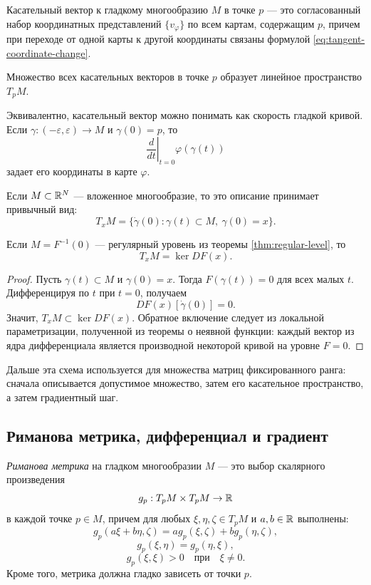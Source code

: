 \begin{definition}
Касательный вектор к гладкому многообразию $M$ в точке $p$ --- это согласованный набор координатных представлений $\{v_\varphi\}$ по всем картам, содержащим $p$, причем при переходе от одной карты к другой координаты связаны формулой \eqref{eq:tangent-coordinate-change}.
\end{definition}

Множество всех касательных векторов в точке $p$ образует линейное пространство $T_pM$.

Эквивалентно, касательный вектор можно понимать как скорость гладкой кривой. Если $\gamma:(-\varepsilon,\varepsilon)\to M$ и $\gamma(0)=p$, то
\[
\left.\frac{d}{dt}\right|_{t=0}\varphi(\gamma(t))
\]
задает его координаты в карте $\varphi$.

Если $M\subset\mathbb{R}^N$ --- вложенное многообразие, то это описание принимает привычный вид:
\[
T_xM=
\{\dot\gamma(0):\gamma(t)\subset M,\ \gamma(0)=x\}.
\]

\begin{proposition}
\label{prop:tangent-regular-level}
Если $M=F^{-1}(0)$ --- регулярный уровень из теоремы \ref{thm:regular-level}, то
\[
T_xM=\ker DF(x).
\]
\end{proposition}

\begin{proof}
Пусть $\gamma(t)\subset M$ и $\gamma(0)=x$. Тогда $F(\gamma(t))=0$ для всех малых $t$. Дифференцируя по $t$ при $t=0$, получаем
\[
DF(x)[\dot\gamma(0)]=0.
\]
Значит, $T_xM\subset\ker DF(x)$. Обратное включение следует из локальной параметризации, полученной из теоремы о неявной функции: каждый вектор из ядра дифференциала является производной некоторой кривой на уровне $F=0$.
\end{proof}

Дальше эта схема используется для множества матриц фиксированного ранга: сначала описывается допустимое множество, затем его касательное пространство, а затем градиентный шаг.

\subsection{Риманова метрика, дифференциал и градиент}

\begin{definition}
\textit{Риманова метрика} на гладком многообразии $M$ --- это выбор скалярного произведения
\[
g_p:T_pM\times T_pM\to\mathbb{R}
\]
в каждой точке $p\in M$, причем для любых $\xi,\eta,\zeta\in T_pM$ и $a,b\in\mathbb{R}$ выполнены:
\[
g_p(a\xi+b\eta,\zeta)=ag_p(\xi,\zeta)+bg_p(\eta,\zeta),
\]
\[
g_p(\xi,\eta)=g_p(\eta,\xi),
\]
\[
g_p(\xi,\xi)>0\quad\text{при}\quad \xi\ne 0.
\]
Кроме того, метрика должна гладко зависеть от точки $p$.
\end{definition}

